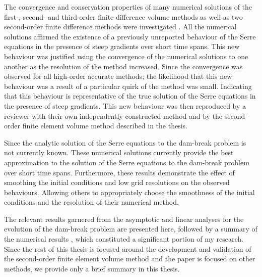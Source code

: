The convergence and conservation properties of many numerical solutions of the first-, second- and third-order finite difference volume methods as well as two second-order finite difference methods were investigated \cite{Pitt-2018-61}. All the numerical solutions affirmed the existence of a previously unreported behaviour of the Serre equations in the presence of steep gradients over short time spans. This new behaviour was justified using the convergence of the numerical solutions to one another as the resolution of the method increased. Since the convergence was observed for all high-order accurate methods; the likelihood that this new behaviour was a result of a particular quirk of the method was small. Indicating that this behaviour is representative of the true solution of the Serre equations in the presence of steep gradients. This new behaviour was then reproduced by a reviewer with their own independently constructed method and by the second-order finite element volume method described in the thesis. 

Since the analytic solution of the Serre equations to the dam-break problem is not currently known. These numerical solutions \cite{Pitt-2018-61} currently provide the best approximation to the solution of the Serre equations to the dam-break problem over short time spans. Furthermore, these results demonstrate the effect of smoothing the initial conditions and low grid resolutions on the observed behaviours. Allowing others to appropriately choose the smoothness of the initial conditions and the resolution of their numerical method.

The relevant results garnered from the asymptotic \cite{El-etal-2006} and linear \cite{Dougalis-etal-2007} analyses for the evolution of the dam-break problem are presented here, followed by a summary of the numerical results \cite{Pitt-2018-61}, which constituted a significant portion of my research. Since the rest of this thesis is focused around the development and validation of the second-order finite element volume method and the paper \cite{Pitt-2018-61} is focused on other methods, we provide only a brief summary in this thesis.

